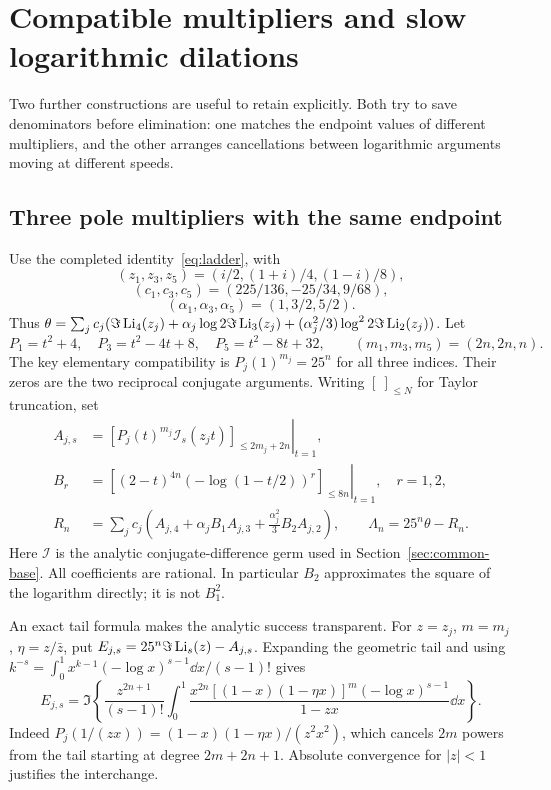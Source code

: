 \section{Compatible multipliers and slow logarithmic dilations}
\label{sec:compatible-case}
Two further constructions are useful to retain explicitly. Both try to
save denominators before elimination: one matches the endpoint values
of different multipliers, and the other arranges cancellations between
logarithmic arguments moving at different speeds.

\subsection{Three pole multipliers with the same endpoint}
Use the completed identity~\eqref{eq:ladder}, with
\[
 (z_1,z_3,z_5)=(i/2,(1+i)/4,(1-i)/8),
\]
\[
 (c_1,c_3,c_5)=(225/136,-25/34,9/68),
\]
\[
 (\alpha_1,\alpha_3,\alpha_5)=(1,3/2,5/2).
\]
Thus $\theta=\sum_jc_j(\Im\operatorname{Li}_4(z_j)+\alpha_j\log2\Im\operatorname{Li}_3(z_j)
 +(\alpha_j^2/3)\log^22\Im\operatorname{Li}_2(z_j))$.
Let
\[
 P_1=t^2+4,\quad P_3=t^2-4t+8,\quad P_5=t^2-8t+32,
 \qquad (m_1,m_3,m_5)=(2n,2n,n).
\]
The key elementary compatibility is $P_j(1)^{m_j}=25^n$ for all
three indices. Their zeros are the two reciprocal conjugate arguments.
Writing $[\ ]_{\leq N}$ for Taylor truncation, set
\begin{align*}
 A_{j,s}&=\left.[P_j(t)^{m_j}\mathcal I_s(z_jt)]_{\leq2m_j+2n}
                                                       \right|_{t=1},\\
 B_r&=\left.[(2-t)^{4n}(-\log(1-t/2))^r]_{\leq8n}\right|_{t=1},\quad r=1,2,\\
 R_n&=\sum_jc_j\left(A_{j,4}+\alpha_jB_1A_{j,3}
                          +\frac{\alpha_j^2}{3}B_2A_{j,2}\right),\qquad
 \Lambda_n=25^n\theta-R_n.
\end{align*}
Here $\mathcal I$ is the analytic conjugate-difference germ used in
Section~\ref{sec:common-base}. All coefficients are rational. In
particular $B_2$ approximates the square of the logarithm directly;
it is not $B_1^2$.

An exact tail formula makes the analytic success transparent. For
$z=z_j$, $m=m_j$, $\eta=z/\bar z$, put
$E_{j,s}=25^n\Im\operatorname{Li}_s(z)-A_{j,s}$. Expanding the geometric tail and
using $k^{-s}=\int_0^1x^{k-1}(-\log x)^{s-1}\dd x/(s-1)!$ gives
\begin{equation}\label{eq:sim-tail}
 E_{j,s}=\Im\left\{\frac{z^{2n+1}}{(s-1)!}
 \int_0^1\frac{x^{2n}[(1-x)(1-\eta x)]^m(-\log x)^{s-1}}
                                      {1-zx}\dd x\right\}.
\end{equation}
Indeed $P_j(1/(zx))=(1-x)(1-\eta x)/(z^2x^2)$, which cancels
$2m$ powers from the tail starting at degree $2m+2n+1$.
Absolute convergence for $|z|<1$ justifies the interchange.

